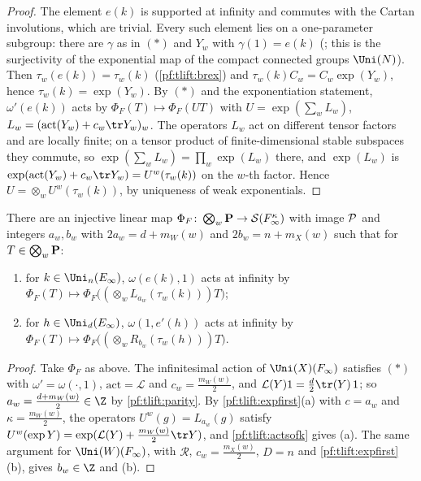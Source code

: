 \begin{proof}
The element $e(k)$ is supported at infinity and commutes with the Cartan involutions, which are trivial. Every such element
lies on a one-parameter subgroup: there are $\gamma$ as in $(\ast)$ and $Y_w$ with $\gamma(1)=e(k)$
(; this is the surjectivity of the exponential map of
the compact connected groups $\Uni(N)$). Then $\tau_w(e(k))=\tau_w(k)$ (\cref{pf:tlift:brex}) and $\tau_w(k)C_w=C_w\exp(Y_w)$, hence
$\tau_w(k)=\exp(Y_w)$. By $(\ast)$ and the exponentiation statement, $\omega'(e(k))$ acts by $\Phi_F(T)\mapsto\Phi_F(UT)$ with
$U=\exp(\sum_w L_w)$, $L_w=(\mathrm{act}(Y_w)+c_w\tr Y_w)_w$. The operators $L_w$ act on different tensor factors and are locally
finite; on a tensor product of finite-dimensional stable subspaces they commute, so $\exp(\sum_wL_w)=\prod_w\exp(L_w)$ there,
and $\exp(L_w)$ is $\exp(\mathrm{act}(Y_w)+c_w\tr Y_w)=U^w(\tau_w(k))$ on the $w$-th factor. Hence $U=\otimes_wU^w(\tau_w(k))$, by uniqueness of weak exponentials.
\end{proof}

\begin{proposition}\label{pf:tlift:fock}
There are an injective linear map $\Phi_F\colon\bigotimes_w\mathbf{P}\to\mathcal{S}(F_\infty^\kappa)$ with image $\mathcal{P}$ and integers
$a_w,b_w$ with $2a_w=d+m_W(w)$ and $2b_w=n+m_X(w)$ such that for $T\in\bigotimes_w\mathbf{P}$:
\begin{enumerate}[label=(\alph*),nosep]
\item for $k\in\Uni_n(E_\infty)$, $\omega(e(k),1)$ acts at infinity by $\Phi_F(T)\mapsto\Phi_F\bigl((\otimes_wL_{a_w}(\tau_w(k)))T\bigr)$;
\item for $h\in\Uni_d(E_\infty)$, $\omega(1,e'(h))$ acts at infinity by $\Phi_F(T)\mapsto\Phi_F\bigl((\otimes_wR_{b_w}(\tau_w(h)))T\bigr)$.
\end{enumerate}
\end{proposition}

\begin{proof}
Take $\Phi_F$ as above. The infinitesimal action of $\Uni(X)(F_\infty)$ satisfies $(\ast)$ with $\omega'=\omega(\cdot,1)$,
$\mathrm{act}=\mathcal L$ and $c_w=\frac{m_W(w)}2$, and $\mathcal L(Y)1=\frac d2\tr(Y)\,1$; so $a_w=\frac{d+m_W(w)}2\in\Z$ by \cref{pf:tlift:parity}.
By \cref{pf:tlift:expfirst}(a) with $c=a_w$ and $\kappa=\frac{m_W(w)}2$, the operators $U^w(g)=L_{a_w}(g)$ satisfy
$U^w(\exp Y)=\exp(\mathcal L(Y)+\frac{m_W(w)}2\tr Y)$, and \cref{pf:tlift:actsofk} gives (a). The same argument for $\Uni(W)(F_\infty)$, with
$\mathcal R$, $c_w=\frac{m_X(w)}2$, $D=n$ and \cref{pf:tlift:expfirst}(b), gives $b_w\in\Z$ and (b).
\end{proof}

